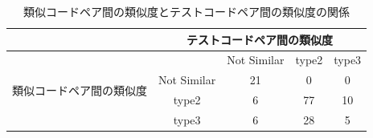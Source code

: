 \documentclass{fose2019}           %
\begin{document}
\begin{table}[]
\centering
\caption{類似コードペア間の類似度とテストコードペア間の類似度の関係}
\begin{tabular}{|c|c|c|c|c|}
\hline
                             & \multicolumn{4}{c|}{\scriptsize テストコードペア間の類似度}         \\ \hline
\multirow{4}{*}{\scriptsize 類似コードペア間の類似度} &             & \scriptsize Not Similar & \scriptsize type2 & \scriptsize type3 \\ \cline{2-5} 
                             & \scriptsize Not Similar & \scriptsize 21          & \scriptsize 0     & \scriptsize 0     \\ \cline{2-5} 
                             &\scriptsize type2       & \scriptsize 6           & \scriptsize 77    & \scriptsize 10    \\ \cline{2-5} 
                             & \scriptsize type3       & \scriptsize 6           & \scriptsize 28    & \scriptsize 5     \\ \hline
\end{tabular}
\end{table}
\end{document}
